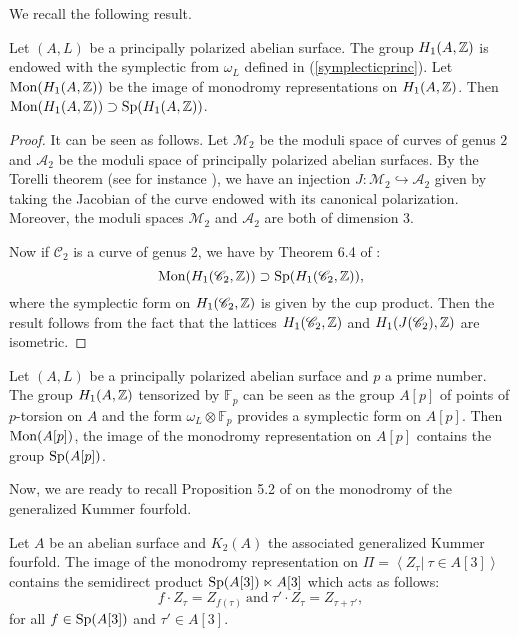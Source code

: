 We recall the following result. 
\begin{prop}
Let $(A,L)$ be a principally polarized abelian surface. The group $H_1(A,\mathbb{Z})$ is endowed with the symplectic from $\omega_L$ defined in (\ref{symplecticprinc}). Let $\operatorname{Mon} (H_1(A,\mathbb{Z}))$ be the image of monodromy representations on $H_1(A,\mathbb{Z})$.
Then $\operatorname{Mon} (H_1(A,\mathbb{Z}))\supset\operatorname{Sp}(H_1(A,\mathbb{Z}))$.
\end{prop}
\begin{proof}
It can be seen as follows.
Let $\mathcal{M}_2$ be the moduli space of curves of genus $2$ and $\mathcal{A}_2$ be the moduli space of principally polarized abelian surfaces.
By the Torelli theorem (see for instance \cite[Theorem 12.1]{Milne}), we have an injection $J:\mathcal{M}_2\hookrightarrow \mathcal{A}_2$ given by taking the Jacobian of the curve endowed with its canonical polarization. Moreover, the moduli spaces $\mathcal{M}_2$ and $\mathcal{A}_2$ are both of dimension 3. 

Now if $\mathscr{C}_2$ is a curve of genus 2, we have by Theorem 6.4 of \cite{Farb}: 
$$\operatorname{Mon} (H_1(\mathscr{C}_2,\mathbb{Z}))\supset \operatorname{Sp}(H_1(\mathscr{C}_2,\mathbb{Z})),$$
where the symplectic form on $H_1(\mathscr{C}_2,\mathbb{Z})$ is given by the cup product. 
Then the result follows from the fact that the lattices $H_1(\mathscr{C}_2,\mathbb{Z})$ and $H_1(J(\mathscr{C}_2),\mathbb{Z})$ are isometric.
\end{proof}
\begin{rmk}\label{SPA2}
Let $(A,L)$ be a principally polarized abelian surface and $p$ a prime number. The group $H_1(A,\mathbb{Z})$ tensorized by $\mathbb{F}_p$ can be seen as the group $A[p]$ of points of $p$-torsion on $A$ and the form $\omega_L\otimes\mathbb{F}_p$ provides a symplectic form on $A[p]$. Then $\operatorname{Mon} (A[p])$, the image of the monodromy representation on $A[p]$ contains the group $\operatorname{Sp}(A[p])$. 
\end{rmk}
Now, we are ready to recall Proposition 5.2 of \cite{Hassett} on the monodromy of the generalized Kummer fourfold.
\begin{prop}\label{Hassettmonodromy}
Let $A$ be an abelian surface and $K_2(A)$ the associated generalized Kummer fourfold. 
The image of the monodromy representation on $\Pi=\left\langle\left. Z_\tau\right|\ \tau\in A[3]\right\rangle$ contains the semidirect product
$\operatorname{Sp}(A[3])\ltimes A[3]$ which acts as follows:
$$f\cdot Z_\tau= Z_{f(\tau)}\ \text{and}\ \tau'\cdot Z_\tau= Z_{\tau+\tau'},$$
for all $f\in \operatorname{Sp}(A[3])$ and $\tau'\in A[3]$.
\end{prop}